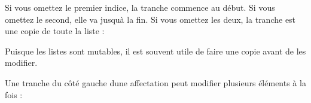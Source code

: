 Si vous omettez le premier indice, la tranche commence au début. Si vous
omettez le second, elle va jusqu\textquotesingle à la fin. Si vous
omettez les deux, la tranche est une copie de toute la liste :

\begin{Shaded}
\begin{Highlighting}[]
\OperatorTok{\textgreater{}\textgreater{}\textgreater{}}
\NormalTok{[}\NormalTok{, }\NormalTok{, }\NormalTok{, }\NormalTok{, }\NormalTok{, }\NormalTok{]}
\end{Highlighting}
\end{Shaded}

Puisque les listes sont mutables, il est souvent utile de faire une
copie avant de les modifier.

Une tranche du côté gauche d\textquotesingle une affectation peut
modifier plusieurs éléments à la fois :

\begin{Shaded}
\begin{Highlighting}[]
\OperatorTok{\textgreater{}\textgreater{}\textgreater{}}\OperatorTok{=}\NormalTok{ [}\NormalTok{, }\NormalTok{, }\NormalTok{, }\NormalTok{, }\NormalTok{, }\NormalTok{]}
\OperatorTok{\textgreater{}\textgreater{}\textgreater{}}\NormalTok{ t[}\NormalTok{:}\NormalTok{] }\OperatorTok{=}\NormalTok{ [}\NormalTok{, }\NormalTok{]}
\OperatorTok{\textgreater{}\textgreater{}\textgreater{}}
\NormalTok{[}\NormalTok{, }\NormalTok{, }\NormalTok{, }\NormalTok{, }\NormalTok{, }\NormalTok{]}
\end{Highlighting}
\end{Shaded}

